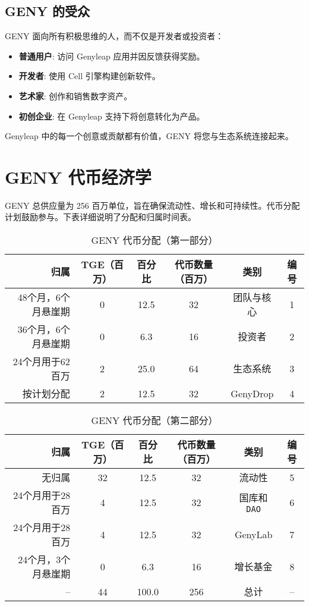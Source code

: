 \documentclass[a4paper,12pt,openany]{book}
\begin{document}
\subsection*{GENY 的受众}
GENY 面向所有积极思维的人，而不仅是开发者或投资者：
\begin{itemize}
    \item \textbf{普通用户}: 访问 Genyleap 应用并因反馈获得奖励。
    \item \textbf{开发者}: 使用 Cell 引擎构建创新软件。
    \item \textbf{艺术家}: 创作和销售数字资产。
    \item \textbf{初创企业}: 在 Genyleap 支持下将创意转化为产品。
\end{itemize}
Genyleap 中的每一个创意或贡献都有价值，GENY 将您与生态系统连接起来。
\newpage

\section*{GENY 代币经济学}
GENY 总供应量为 256 百万单位，旨在确保流动性、增长和可持续性。代币分配计划鼓励参与。下表详细说明了分配和归属时间表。

\begin{table}[h]
\centering
\caption{GENY 代币分配（第一部分）}
\small
\begin{tabular}{r c c c c c}
\hline
\textbf{归属} & \textbf{TGE（百万）} & \textbf{百分比} & \textbf{代币数量（百万）} & \textbf{类别} & \textbf{编号} \\
\hline
48个月，6个月悬崖期 & 0 & 12.5 & 32 & 团队与核心 & 1 \\
36个月，6个月悬崖期 & 0 & 6.3 & 16 & 投资者 & 2 \\
24个月用于62百万 & 2 & 25.0 & 64 & 生态系统 & 3 \\
按计划分配 & 2 & 12.5 & 32 & GenyDrop & 4 \\
\hline
\end{tabular}
\end{table}

\begin{table}[h]
\centering
\caption{GENY 代币分配（第二部分）}
\small
\begin{tabular}{r c c c c c}
\hline
\textbf{归属} & \textbf{TGE（百万）} & \textbf{百分比} & \textbf{代币数量（百万）} & \textbf{类别} & \textbf{编号} \\
\hline
无归属 & 32 & 12.5 & 32 & 流动性 & 5 \\
24个月用于28百万 & 4 & 12.5 & 32 & 国库和 \texttt{DAO} & 6 \\
24个月用于28百万 & 4 & 12.5 & 32 & GenyLab & 7 \\
24个月，3个月悬崖期 & 0 & 6.3 & 16 & 增长基金 & 8 \\
\hline
-- & 44 & 100.0 & 256 & 总计 & -- \\
\hline
\end{tabular}
\end{table}
\end{document}
